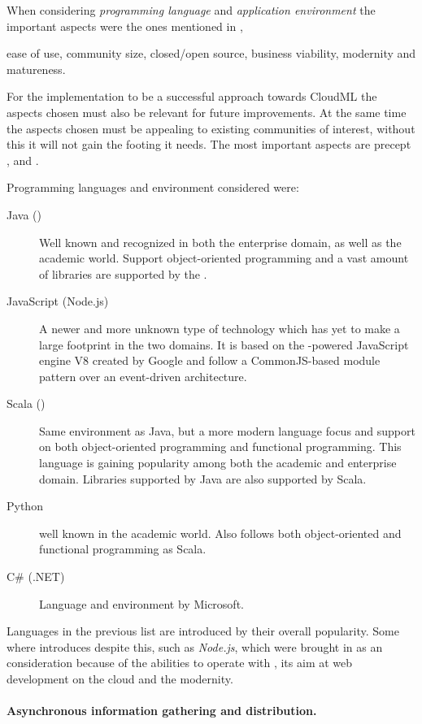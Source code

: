 When considering \emph{programming language} and \emph{application environment} 
the important aspects were the ones mentioned in ,
\begin{ii}
  \iitem ease of use,
  \iitem community size,
  \iitem closed/open source,
  \iitem business viability,
  \iitem modernity and 
  \iitem matureness.
\end{ii}
For the implementation to be a successful approach towards CloudML 
the aspects chosen must also be relevant for future improvements.
At the same time the aspects chosen must be appealing to existing communities of interest,
without this it will not gain the footing it needs.
The most important aspects are precept ,  and .

Programming languages and environment considered were:
\begin{description}
  \item[Java ()] Well known and recognized in both the enterprise domain, as well as the academic world.
    Support object-oriented programming and a vast amount of libraries are supported by the .
  \item[JavaScript (Node.js)] A newer and more unknown type of technology which has yet to 
    make a large footprint in the two domains. 
    It is based on the -powered JavaScript engine V8 created by Google and follow a 
    CommonJS-based module pattern over an event-driven architecture.
  \item[Scala ()] Same environment as Java, but a more modern language focus and support on both 
    object-oriented programming and functional programming.
    This language is gaining popularity among both the academic and enterprise domain.
    Libraries supported by Java are also supported by Scala.
  \item[Python] well known in the academic world. Also follows both object-oriented and functional programming as
    Scala.
  \item[C\# (.NET)] Language and environment by Microsoft.
\end{description}
Languages in the previous list are introduced by their overall popularity.
Some where introduces despite this, such as \emph{Node.js}, 
which were brought in as an consideration because of the abilities to operate
with , its aim at web development on the cloud and the modernity.

\paragraph{Asynchronous information gathering and distribution.}

